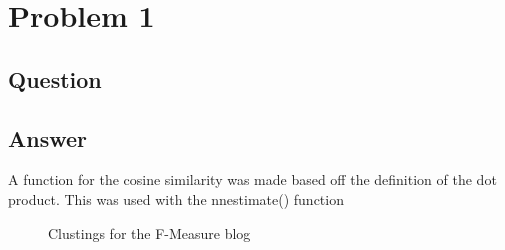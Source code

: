 \section{Problem 1}

\subsection{Question}


\subsection{Answer}
A function for the cosine similarity was made based off the definition of the dot product. This was used with the nnestimate() function



\begin{figure}[h]
\centering
{}
\caption{Clustings for the F-Measure blog}
\label{fig:clust_f}
\end{figure}

